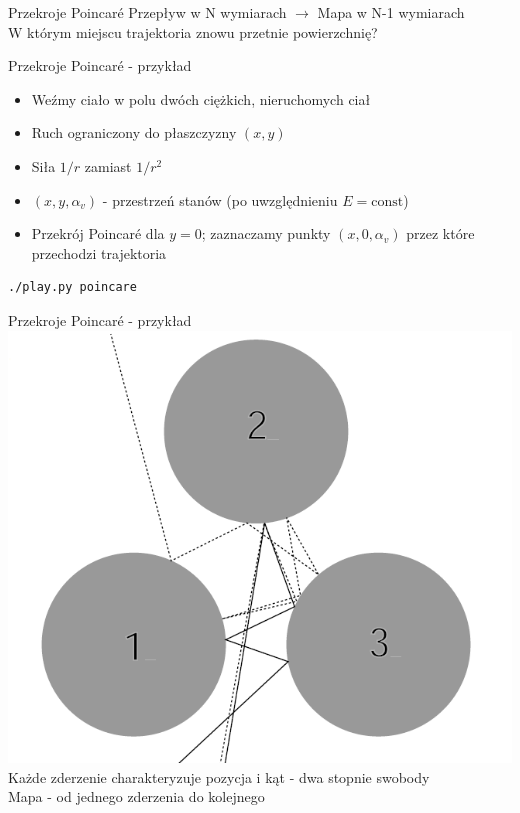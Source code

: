 \documentclass{beamer}
\begin{document}
\begin{frame}{Przekroje Poincaré} \pause
Przepływ w N wymiarach $\rightarrow$ Mapa w N-1 wymiarach\\ \pause
W którym miejscu trajektoria znowu przetnie powierzchnię?\\ \pause
\end{frame}

\begin{frame}[fragile]{Przekroje Poincaré - przykład}
\begin{itemize}[<+->]
	\item Weźmy ciało w polu dwóch ciężkich, nieruchomych ciał
	\item Ruch ograniczony do płaszczyzny $(x,y)$
	\item Siła $1/r$ zamiast $1/r^2$
	\item $(x, y, \alpha_v)$ - przestrzeń stanów (po uwzględnieniu $E=\text{const}$)
	\item Przekrój Poincaré dla $y=0$; zaznaczamy punkty $(x, 0, \alpha_v)$ przez które przechodzi trajektoria
\end{itemize} 
\pause
\begin{lstlisting}
./play.py poincare
\end{lstlisting}
\end{frame}

\begin{frame}{Przekroje Poincaré - przykład}
\centering
\includegraphics[height=0.7\textheight]{pinball}\\
Każde zderzenie charakteryzuje pozycja i kąt - dwa stopnie swobody\\
Mapa - od jednego zderzenia do kolejnego
\end{frame}
\end{document}
